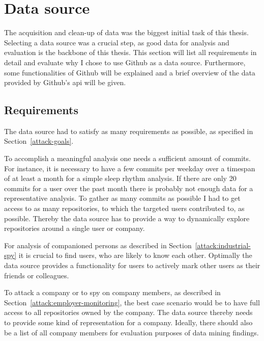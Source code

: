 \section{Data source}\label{data-source}
The acquisition and clean-up of data was the biggest initial task of this thesis.
Selecting a data source was a crucial step, as good data for analysis and evaluation is the backbone of this thesis.
This section will list all requirements in detail and evaluate why I chose to use Github as a data source.
Furthermore, some functionalities of Github will be explained and a brief overview of the data provided by Github's \ac{api} will be given.


\subsection{Requirements}\label{requirements}
The data source had to satisfy as many requirements as possible, as specified in Section~\ref{attack-goals}.

To accomplish a meaningful analysis one needs a sufficient amount of commits.
For instance, it is necessary to have a few commits per weekday over a timespan of at least a month for a simple sleep rhythm analysis.
If there are only 20 commits for a user over the past month there is probably not enough data for a representative analysis.
To gather as many commits as possible I had to get access to as many repositories, to which the targeted users contributed to, as possible.
Thereby the data source has to provide a way to dynamically explore repositories around a single user or company.

For analysis of companioned persons as described in Section~\ref{attack:industrial-spy} it is crucial to find users, who are likely to know each other.
Optimally the data source provides a functionality for users to actively mark other users as their friends or colleagues.

To attack a company or to spy on company members, as described in Section~\ref{attack:employer-monitoring}, the best case scenario would be to have full access to all repositories owned by the company.
The data source thereby needs to provide some kind of representation for a company.
Ideally, there should also be a list of all company members for evaluation purposes of data mining findings.


